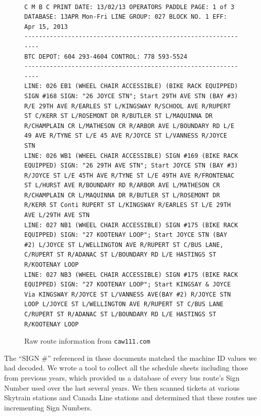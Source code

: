 \documentclass[fontsize=12pt]{scrartcl}
\begin{document}
\lstset{breaklines=true}
\lstset{showspaces=false,showstringspaces=false}
\lstset{basicstyle=\ttfamily\scriptsize}
\begin{figure}[ht!]
\begin{lstlisting}

C M B C PRINT DATE: 13/02/13 OPERATORS PADDLE PAGE: 1 of 3 DATABASE: 13APR Mon-Fri LINE GROUP: 027 BLOCK NO. 1 EFF: Apr 15, 2013
---------------------------------------------------------------
BTC DEPOT: 604 293-4604 CONTROL: 778 593-5524
---------------------------------------------------------------
LINE: 026 EB1 (WHEEL CHAIR ACCESSIBLE) (BIKE RACK EQUIPPED) SIGN #168 SIGN: "26 JOYCE STN"; Start 29TH AVE STN (BAY #3) R/E 29TH AVE R/EARLES ST L/KINGSWAY R/SCHOOL AVE R/RUPERT ST C/KERR ST L/ROSEMONT DR R/BUTLER ST L/MAQUINNA DR R/CHAMPLAIN CR L/MATHESON CR R/ARBOR AVE L/BOUNDARY RD L/E 49 AVE R/TYNE ST L/E 45 AVE R/JOYCE ST L/VANNESS R/JOYCE STN
LINE: 026 WB1 (WHEEL CHAIR ACCESSIBLE) SIGN #169 (BIKE RACK EQUIPPED) SIGN: "26 29TH AVE STN"; Start JOYCE STN (BAY #3) R/JOYCE ST L/E 45TH AVE R/TYNE ST L/E 49TH AVE R/FRONTENAC ST L/HURST AVE R/BOUNDARY RD R/ARBOR AVE L/MATHESON CR R/CHAMPLAIN CR L/MAQUINNA DR R/BUTLER ST L/ROSEMONT DR R/KERR ST Conti RUPERT ST L/KINGSWAY R/EARLES ST L/E 29TH AVE L/29TH AVE STN
LINE: 027 NB1 (WHEEL CHAIR ACCESSIBLE) SIGN #175 (BIKE RACK EQUIPPED) SIGN: "27 KOOTENAY LOOP"; Start JOYCE STN (BAY #2) L/JOYCE ST L/WELLINGTON AVE R/RUPERT ST C/BUS LANE, C/RUPERT ST R/ADANAC ST L/BOUNDARY RD L/E HASTINGS ST R/KOOTENAY LOOP
LINE: 027 NB3 (WHEEL CHAIR ACCESSIBLE) SIGN #175 (BIKE RACK EQUIPPED) SIGN: "27 KOOTENAY LOOP"; Start KINGSAY & JOYCE Via KINGSWAY R/JOYCE ST L/VANNESS AVE(BAY #2) R/JOYCE STN LOOP L/JOYCE ST L/WELLINGTON AVE R/RUPERT ST C/BUS LANE C/RUPERT ST R/ADANAC ST L/BOUNDARY RD L/E HASTINGS ST R/KOOTENAY LOOP
\end{lstlisting}
\caption{Raw route information from \texttt{caw111.com}}
\end{figure}

\lstset{basicstyle=\ttfamily\small}



The ``SIGN \#'' referenced in these documents matched the machine ID values we had decoded. We wrote a tool to collect all the schedule sheets including those from previous years, which provided us a database of every bus route's Sign Number used over the last several years. We then scanned tickets at various Skytrain stations and Canada Line stations and determined that these routes use incrementing Sign Numbers.
\end{document}
